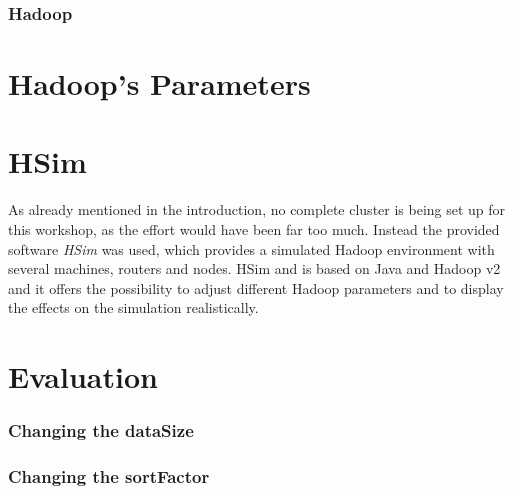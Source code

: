 \subsection{Hadoop}
\cite[see][]{AP1}
\chapter{Hadoop's Parameters}
\label{params}

\chapter{HSim}
\label{hsim}
As already mentioned in the introduction, no complete cluster is being set up for this workshop, as the effort would have been far too much. Instead the provided software \textit{HSim} was used, which provides a simulated Hadoop environment with several machines, routers and nodes. HSim and is based on Java and Hadoop v2 and it offers the possibility to adjust different Hadoop parameters and to display the effects on the simulation realistically.
\chapter{Evaluation}
\label{eval}
\subsection{Changing the dataSize}
\subsection{Changing the sortFactor}
